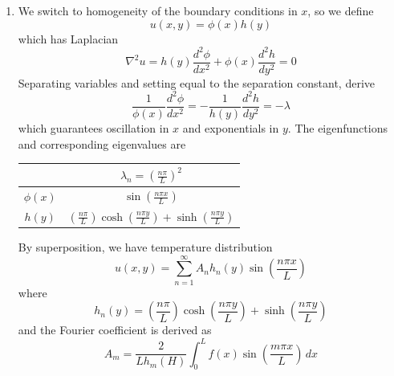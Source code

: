 \documentclass[a4paper]{article}
\begin{document}
\begin{enumerate}[label=(\alph*)]
\begin{center}
\begin{tabular}{|c||c|}
			\hline
		\end{tabular}
	\end{center}
	By superposition, we have temperature distribution
	\[
		u \!\left( x,y \right) = \sum^{\infty}_{n=1} A_{n}\sinh\!\left[\frac{\!\left( 2n - 1 \right)\pi \!\left( x - L \right)}{2H}\right]\cos\!\left[\frac{\!\left( 2n - 1 \right)\pi y}{2H}\right]
	\]
	where the Fourier coefficient is derived as:
	\[
		A_{m} = -\frac{2}{H \sinh\!\left[\!\left( 2m - 1 \right)\pi L / 2H\right]}\int^{H}_{0} g \!\left( y \right)\cos\!\left[\frac{\!\left( 2m - 1 \right)\pi y}{2H}\right] \, dy 
	\]
	\item We switch to homogeneity of the boundary conditions in \( x \), so we define
	\[
		u \!\left( x,y \right) = \phi \!\left( x \right)h \!\left( y \right) 
	\]
	which has Laplacian
	\[
		\nabla^{2}u = h \!\left( y \right)\frac{d^2 \phi}{d x^2} + \phi \!\left( x \right)\frac{d^2 h}{d y^2} = 0 
	\]
	Separating variables and setting equal to the separation constant, derive
	\[
		\frac{1}{\phi \!\left( x \right)}\frac{d^2 \phi}{d x^2} = -\frac{1}{h \!\left( y \right)}\frac{d^2 h}{d y^2} = -\lambda 
	\]
	which guarantees oscillation in \( x \) and exponentials in \( y \). The eigenfunctions and corresponding eigenvalues are
	\begin{center}
		\renewcommand{\arraystretch}{1.8}
		\setlength{\arraycolsep}{10pt}
		\begin{tabular}{|c||c|}
			\hline
			\rule[-1.2em]{0pt}{3em}
			 & \( \lambda_{n} = \displaystyle{\!\left( \frac{n \pi}{L} \right)^{2}} \) \\
			\hline\hline
			\rule[-1.2em]{0pt}{3em}
					\( \phi \!\left( x \right) \) & \( \displaystyle{\sin\!\left(\frac{n \pi x}{L}\right)} \) \\
			\hline
			\rule[-1.2em]{0pt}{3em}
					\( h \!\left( y \right) \) & \( \displaystyle{\!\left( \frac{n \pi}{L} \right)\cosh\!\left(\frac{n \pi y}{L}\right) + \sinh\!\left(\frac{n \pi y}{L} \right)} \) \\
			\hline
		\end{tabular}
	\end{center}
	By superposition, we have temperature distribution
	\[
		u \!\left( x,y \right) = \sum^{\infty}_{n=1} A_{n}h_{n}\!\left( y \right)\sin\!\left(\frac{n \pi x}{L}\right)
	\]
	where
	\[
		h_{n}\!\left( y \right) = \!\left( \frac{n \pi}{L} \right)\cosh\!\left(\frac{n \pi y}{L}\right) + \sinh\!\left(\frac{n \pi y}{L}\right)
	\]
	and the Fourier coefficient is derived as 
	\[
		A_{m} = \frac{2}{L h_{m}\!\left( H \right)}\int^{L}_{0} f \!\left( x \right)\sin\!\left(\frac{m \pi x}{L}\right) \, dx 
\]
\end{enumerate}
\end{document}
